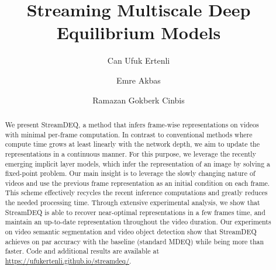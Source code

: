 \documentclass[runningheads]{llncs}
\let\svthefootnote\thefootnote
\newcommand\freefootnote[1]{\let\thefootnote\relax \footnotetext{#1}\let\thefootnote\svthefootnote }
\renewcommand{\thefootnote}{*}
\begin{document}
\pagestyle{headings}
\mainmatter


\title{Streaming Multiscale Deep Equilibrium Models} 




\author{Can Ufuk Ertenli\inst{} \and
Emre Akbas\inst{*} \and
Ramazan Gokberk Cinbis\inst{*}}


\maketitle




\begin{abstract}
We present StreamDEQ, a method that infers frame-wise representations on videos with minimal per-frame computation. In contrast to conventional methods where compute time grows at least linearly with the network depth, we aim to update the representations in a continuous manner. For this purpose, we leverage the recently emerging implicit layer models, which infer the representation of an image by solving a fixed-point problem. Our main insight is to leverage the slowly changing nature of videos and use the previous frame representation as an initial condition on each frame. This scheme effectively recycles the recent inference computations and greatly reduces the needed processing time. Through extensive experimental analysis, we show that StreamDEQ is able to recover near-optimal representations in a few frames time, and maintain an up-to-date representation throughout the video duration. Our experiments on video semantic segmentation and video object detection show that StreamDEQ achieves on par accuracy with the baseline (standard MDEQ) while being more than  faster. Code and additional results are available at \url{https://ufukertenli.github.io/streamdeq/}.


\end{abstract}


\freefootnote{To appear at ECCV 2022.}
\end{document}
